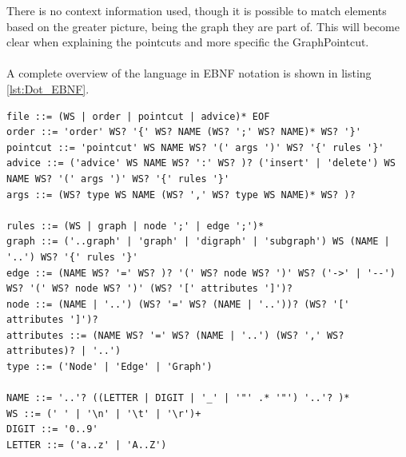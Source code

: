 \documentclass[a4paper]{report}
\begin{document}
There is no context information used, though it is possible to match elements based on the greater picture, being the graph they are part of. This will become clear when explaining the pointcuts and more specific the GraphPointcut.\\
\\
A complete overview of the language in EBNF notation is shown in listing \ref{lst:Dot_EBNF}.
\begin{lstlisting}[caption=EBNF notation of the aspect language., label=lst:Dot_EBNF]
file ::= (WS | order | pointcut | advice)* EOF
order ::= 'order' WS? '{' WS? NAME (WS? ';' WS? NAME)* WS? '}'
pointcut ::= 'pointcut' WS NAME WS? '(' args ')' WS? '{' rules '}' 
advice ::= ('advice' WS NAME WS? ':' WS? )? ('insert' | 'delete') WS NAME WS? '(' args ')' WS? '{' rules '}'
args ::= (WS? type WS NAME (WS? ',' WS? type WS NAME)* WS? )?

rules ::= (WS | graph | node ';' | edge ';')*
graph ::= ('..graph' | 'graph' | 'digraph' | 'subgraph') WS (NAME | '..') WS? '{' rules '}'
edge ::= (NAME WS? '=' WS? )? '(' WS? node WS? ')' WS? ('->' | '--') WS? '(' WS? node WS? ')' (WS? '[' attributes ']')?
node ::= (NAME | '..') (WS? '=' WS? (NAME | '..'))? (WS? '[' attributes ']')?
attributes ::= (NAME WS? '=' WS? (NAME | '..') (WS? ',' WS? attributes)? | '..')
type ::= ('Node' | 'Edge' | 'Graph')

NAME ::= '..'? ((LETTER | DIGIT | '_' | '"' .* '"') '..'? )* 
WS ::= (' ' | '\n' | '\t' | '\r')+
DIGIT ::= '0..9'
LETTER ::= ('a..z' | 'A..Z')
\end{lstlisting}
\end{document}
